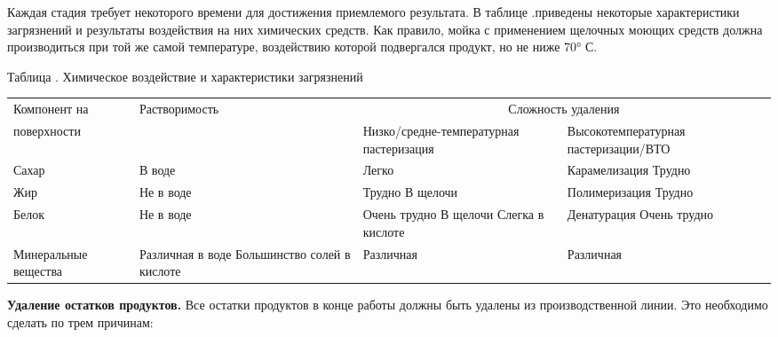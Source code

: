 {\begin{itemize}[leftmargin=2.15cm, labelwidth=0.65cm, labelsep=0.0cm]
	\setcounter{itemcntr}{1}
\end{itemize}

\par \redline Каждая стадия требует некоторого времени для достижения приемлемого результата.
В таблице \thechaptercntr .\thetablecntr \spc  приведены некоторые характеристики загрязнений и результаты воздействия на них химических средств. Как правило, мойка с применением щелочных моющих средств должна производиться при той же самой температуре, воздействию которой подвергался продукт, но не ниже 70° С.

\par \redline \phantom{помогіте} 

\begin{flushleft}
	\par \centering Таблица \thechaptercntr .\thetablecntr \spc {--} Химическое воздействие и характеристики загрязнений
\end{flushleft} \addtocounter{thetablecntr}{1}

\begin{center}
	\begin{tabular}{|p{2.7cm}|p{3cm}|p{4cm}|p{4.2cm}|}
	\hline
	Компонент на & Растворимость & \multicolumn{2}{c|}{ Сложность удаления} \\
	\cline{3-4}
	поверхности&  & Низко/средне-температурная пастеризация & Высокотемпературная пастеризации/ВТО \\
	\hline
	Сахар & В воде & Легко & Карамелизация Трудно \\
	\hline
	Жир & Не в воде & Трудно В щелочи & Полимеризация Трудно \\
	\hline
	Белок & Не в воде & Очень трудно В щелочи Слегка в кислоте & Денатурация Очень трудно \\
	\hline
	Минеральные вещества & Различная в воде Большинство солей в кислоте & Различная & Различная \\
	\hline
\end{tabular}

\end{center}
\par \redline \phantom{помогіте} 

\par \redline \textbf{Удаление остатков продуктов.} Все остатки продуктов в конце работы должны быть удалены из производственной линии.
Это необходимо сделать по трем причинам:

\begin{itemize}[leftmargin=2.15cm, labelwidth=0.65cm, labelsep=0.0cm] 
	

\end{itemize}}
